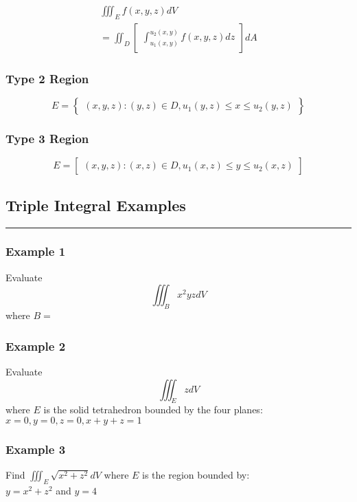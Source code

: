 \documentclass[12pt]{article}
\begin{document}
\begin{align*}
	\iiint_E f(x,y,z) dV \\
	= \iint_{D}\begin{bmatrix}\int_{u_1(x,y)}^{u_2(x,y)}f(x,y,z)dz\end{bmatrix}dA
\end{align*}

\subsubsection{Type 2 Region}
\[
	E = \begin{Bmatrix}
		(x,y,z): (y,z) \in D, u_1(y,z) \leq x \leq u_2(y,z)
	\end{Bmatrix}
\]

\subsubsection{Type 3 Region}
\[
	E = \begin{bmatrix} (x,y,z): (x,z) \in D, u_1(x,z) \leq y \leq u_2(x,z) \end{bmatrix} 
\]
\subsection{Triple Integral Examples}
\rule{\textwidth}{0.1mm}

\subsubsection{Example 1}
Evaluate 
\[
	\iiint_{B} x^2yzdV
\]
where \(B = \)

\subsubsection{Example 2}
Evaluate 
\[
	\iiint_E zdV 
\]
where \(E\) is the solid tetrahedron bounded by the four planes: \(x = 0, y = 0, z = 0, x + y + z = 1\)

\subsubsection{Example 3}
Find \(\iiint_E \sqrt{x^2 + z^2} dV\) where \(E\) is the region bounded by: \\
\( y = x^2 + z^2 \) and \( y = 4\)
\end{document}
